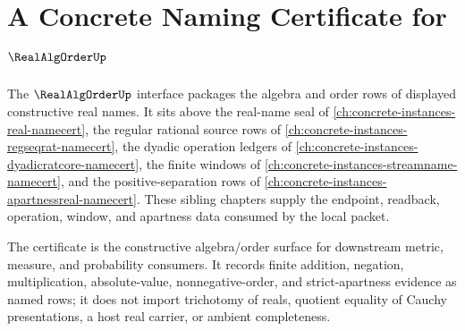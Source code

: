 \chapter{A Concrete Naming Certificate for $\RealAlgOrderUp$}
\label{ch:concrete-instances-real-alg-order-namecert}

The $\RealAlgOrderUp$ interface packages the algebra and order rows of displayed constructive real names. It sits above the real-name seal of \autoref{ch:concrete-instances-real-namecert}, the regular rational source rows of \autoref{ch:concrete-instances-regseqrat-namecert}, the dyadic operation ledgers of \autoref{ch:concrete-instances-dyadicratcore-namecert}, the finite windows of \autoref{ch:concrete-instances-streamname-namecert}, and the positive-separation rows of \autoref{ch:concrete-instances-apartnessreal-namecert}. These sibling chapters supply the endpoint, readback, operation, window, and apartness data consumed by the local packet.

The certificate is the constructive algebra/order surface for downstream metric, measure, and probability consumers. It records finite addition, negation, multiplication, absolute-value, nonnegative-order, and strict-apartness evidence as named rows; it does not import trichotomy of reals, quotient equality of Cauchy presentations, a host real carrier, or ambient completeness.

